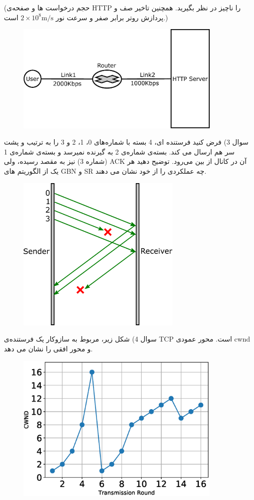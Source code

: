 \documentclass[10pt,letterpaper]{article}
\begin{document}
(حجم درخواست ها و صفحه‌ی HTTP را ناچیز در نظر بگیرید. همچنین تاخیر صف و پردازش روتر برابر صفر و سرعت نور 
$
2\times 10^8 \text{m/s}
$
است.)
\begin{figure}[htb]
\centering
\includegraphics[width=100mm]{Q2.eps}
\end{figure}
\newpage
سوال 3) فرض کنید فرستنده ای، 4 بسته با شماره‌های 0، 1، 2 و 3 را به ترتیب و پشت سر هم ارسال می کند. بسته‌ی شماره‌ی 2 به گیرنده نمیرسد و بسته‌ی شماره‌ی 1 (شماره 3) نیز به مقصد رسیده، ولی ACK آن در کانال از بین می‌رود. توضیح دهید هر یک از الگوریتم های 
GBN
و
SR
چه عملکردی را از خود نشان می دهند.
\begin{figure}[htb]
\centering
\includegraphics[width=80mm]{Q3.eps}
\end{figure}
\newpage
سوال 4) شکل زیر، مربوط به سازوکار  یک فرستنده‌ی TCP است. محور عمودی cwnd و محور افقی  را نشان می دهد.
\begin{figure}[htb]
\centering
\includegraphics[width=100mm]{Q5.eps}
\end{figure}
\end{document}

